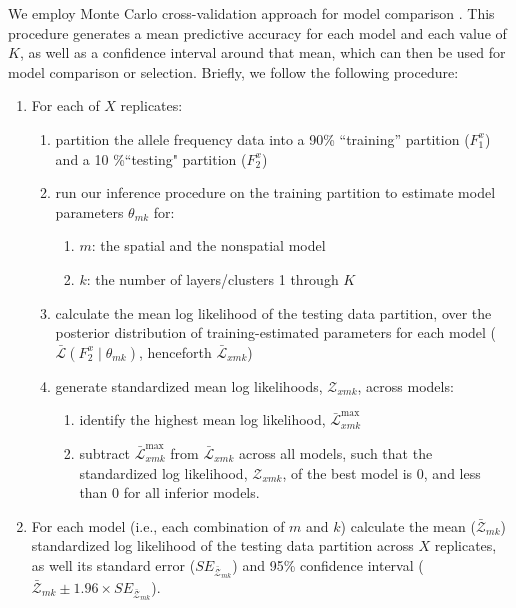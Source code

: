 \documentclass[10pt,letterpaper]{article}
\begin{document}
We employ Monte Carlo cross-validation approach for model comparison \cite{picard1984}. 
This procedure generates a mean predictive accuracy for each model and each value of $K$, 
as well as a confidence interval around that mean,
which can then be used for model comparison or selection.
Briefly, we follow the following procedure:
\begin{enumerate}
\item For each of $X$ replicates:
	\begin{enumerate}
		\item partition the allele frequency data into a 90\% ``training'' partition ($F^x_1$) and a 10 \%``testing" partition ($F^x_2$) \label{partition}
		\item run our inference procedure on the training partition to estimate model parameters $\theta_{mk}$ for: \label{inference}
			\begin{enumerate}
				\item $m$: the spatial and the nonspatial model
				\item $k$: the number of layers/clusters 1 through $K$
			\end{enumerate}	
	\item calculate the mean log likelihood of the testing data partition, 
	over the posterior distribution of training-estimated parameters for each model 
	($\bar{\mathcal{L}}(F^x_2 \mid \theta_{mk})$, henceforth $\bar{\mathcal{L}}_{xmk}$) \label{lnL}
	\item generate standardized mean log likelihoods, $\mathcal{Z}_{xmk}$, across models: \label{standardize}
		\begin{enumerate}
			\item identify the highest mean log likelihood, $\bar{\mathcal{L}}^\text{max}_{xmk}$
			\item subtract $\bar{\mathcal{L}}^\text{max}_{xmk}$ from $\bar{\mathcal{L}}_{xmk}$ across all models,
				such that the standardized log likelihood, $\mathcal{Z}_{xmk}$, of the best model is 0,
				and less than 0 for all inferior models. 
		\end{enumerate}
	\end{enumerate}
\item For each model (i.e., each combination of $m$ and $k$) calculate 
	the mean ($	\bar{\mathcal{Z}}_{mk} $) standardized log likelihood of the testing data partition across $X$ replicates, 
	as well its standard error ($SE_{\bar{\mathcal{Z}}_{mk}}$) and
        95\% confidence interval ($\bar{\mathcal{Z}}_{mk} \pm 1.96 \times SE_{\bar{\mathcal{Z}}_{mk}}$).
\end{enumerate}
\end{document}
